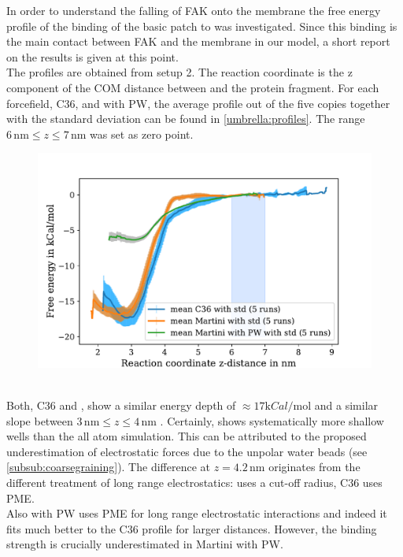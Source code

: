 \label{results:umbrella}
In order to understand the falling of FAK onto the membrane the free energy profile of the binding of the basic patch to \pip{} was investigated. Since this binding is the main contact between FAK and the membrane in our model, a short report on the results is given at this point.\\
The profiles are obtained from setup 2. The reaction coordinate is the z component of the COM distance between \pip{} and the protein fragment. For each forcefield, C36, \martini{} and \martini{} with PW, the average profile out of the five copies together with the standard deviation can be found in \autoref{umbrella:profiles}. The range $6\,\si{\nano\metre} \le z \le 7\,\si{\nano\metre}$ was set as zero point.\\
%
%
%
\begin{figure}[hb]
	\centering
	\includegraphics[width=.8\textwidth]{figures/results/umbrella}
	\label{umbrella:profiles}
\end{figure}
%
%
%
\\
Both, C36 and \martini{}, show a similar energy depth of $\approx 17 \si{\kilo Cal/\mole}$ and a similar slope between $3\,\si{\nano\metre} \le z \le 4\,\si{\nano\metre}$ . Certainly, \martini{} shows systematically more shallow wells than the all atom simulation. This can be attributed to the proposed underestimation of electrostatic forces due to the unpolar water beads (see \autoref{subsub:coarsegraining}). The difference at $z = 4.2\,\si{\nano\metre}$ originates from the different treatment of long range electrostatics: \martini{} uses a cut-off radius, C36 uses PME.\\ %
Also \martini{} with PW uses PME for long range electrostatic interactions and indeed it fits much better to the C36 profile for larger distances. However, the binding strength is crucially underestimated in Martini with PW.\\
